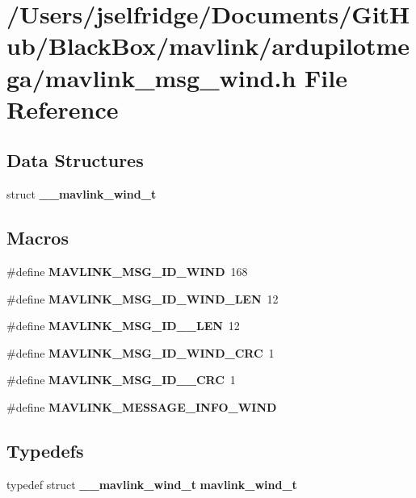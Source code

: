 \section{/\+Users/jselfridge/\+Documents/\+Git\+Hub/\+Black\+Box/mavlink/ardupilotmega/mavlink\+\_\+msg\+\_\+wind.h File Reference}
\label{mavlink__msg__wind_8h}
\subsection*{Data Structures}
\begin{DoxyCompactItemize}
\item 
struct \textbf{ \+\_\+\+\_\+mavlink\+\_\+wind\+\_\+t}
\end{DoxyCompactItemize}
\subsection*{Macros}
\begin{DoxyCompactItemize}
\item 
\#define \textbf{ M\+A\+V\+L\+I\+N\+K\+\_\+\+M\+S\+G\+\_\+\+I\+D\+\_\+\+W\+I\+ND}~168
\item 
\#define \textbf{ M\+A\+V\+L\+I\+N\+K\+\_\+\+M\+S\+G\+\_\+\+I\+D\+\_\+\+W\+I\+N\+D\+\_\+\+L\+EN}~12
\item 
\#define \textbf{ M\+A\+V\+L\+I\+N\+K\+\_\+\+M\+S\+G\+\_\+\+I\+D\+\_\+\_\+\+L\+EN}~12
\item 
\#define \textbf{ M\+A\+V\+L\+I\+N\+K\+\_\+\+M\+S\+G\+\_\+\+I\+D\+\_\+\+W\+I\+N\+D\+\_\+\+C\+RC}~1
\item 
\#define \textbf{ M\+A\+V\+L\+I\+N\+K\+\_\+\+M\+S\+G\+\_\+\+I\+D\+\_\+\_\+\+C\+RC}~1
\item 
\#define \textbf{ M\+A\+V\+L\+I\+N\+K\+\_\+\+M\+E\+S\+S\+A\+G\+E\+\_\+\+I\+N\+F\+O\+\_\+\+W\+I\+ND}
\end{DoxyCompactItemize}
\subsection*{Typedefs}
\begin{DoxyCompactItemize}
\item 
typedef struct \textbf{ \+\_\+\+\_\+mavlink\+\_\+wind\+\_\+t} \textbf{ mavlink\+\_\+wind\+\_\+t}
\end{DoxyCompactItemize}



